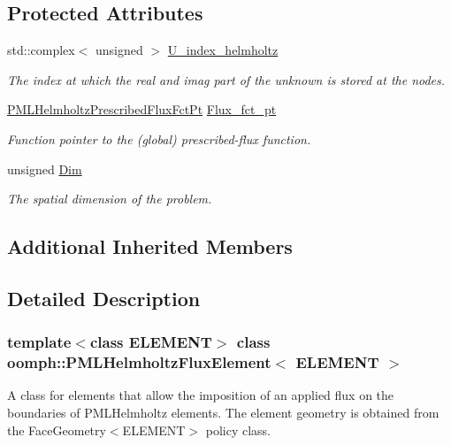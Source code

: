 \subsection*{Protected Attributes}
\begin{DoxyCompactItemize}
\item 
std\+::complex$<$ unsigned $>$ \hyperlink{classoomph_1_1PMLHelmholtzFluxElement_a34f53e4408eeba19c609519746179e7e}{U\+\_\+index\+\_\+helmholtz}
\begin{DoxyCompactList}\small\item\em The index at which the real and imag part of the unknown is stored at the nodes. \end{DoxyCompactList}\item 
\hyperlink{classoomph_1_1PMLHelmholtzFluxElement_af376593418510a6fcbc23cc13f3d6b22}{P\+M\+L\+Helmholtz\+Prescribed\+Flux\+Fct\+Pt} \hyperlink{classoomph_1_1PMLHelmholtzFluxElement_aa4f97625c7e71e7cb935cb5a753d8f9c}{Flux\+\_\+fct\+\_\+pt}
\begin{DoxyCompactList}\small\item\em Function pointer to the (global) prescribed-\/flux function. \end{DoxyCompactList}\item 
unsigned \hyperlink{classoomph_1_1PMLHelmholtzFluxElement_a827a510a87a761004c8c667a78b3d9fb}{Dim}
\begin{DoxyCompactList}\small\item\em The spatial dimension of the problem. \end{DoxyCompactList}\end{DoxyCompactItemize}
\subsection*{Additional Inherited Members}


\subsection{Detailed Description}
\subsubsection*{template$<$class E\+L\+E\+M\+E\+NT$>$\newline
class oomph\+::\+P\+M\+L\+Helmholtz\+Flux\+Element$<$ E\+L\+E\+M\+E\+N\+T $>$}

A class for elements that allow the imposition of an applied flux on the boundaries of P\+M\+L\+Helmholtz elements. The element geometry is obtained from the Face\+Geometry$<$\+E\+L\+E\+M\+E\+N\+T$>$ policy class. 


